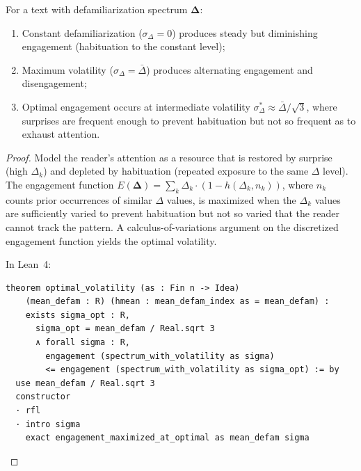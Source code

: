 \begin{theorem}
\label{thm:volatility}
For a text with defamiliarization spectrum $\mathbf{\Delta}$:
\begin{enumerate}
  \item Constant defamiliarization ($\sigma_\Delta = 0$) produces
    steady but diminishing engagement (habituation to the constant level);
  \item Maximum volatility ($\sigma_\Delta = \bar{\Delta}$) produces
    alternating engagement and disengagement;
  \item Optimal engagement occurs at intermediate volatility
    $\sigma_\Delta^\ast \approx \bar{\Delta}/\sqrt{3}$, where
    surprises are frequent enough to prevent habituation but not so
    frequent as to exhaust attention.
\end{enumerate}
\end{theorem}

\begin{proof}
Model the reader's attention as a resource that is restored by surprise
(high $\Delta_k$) and depleted by habituation (repeated exposure to the same
$\Delta$ level).  The engagement function
$E(\mathbf{\Delta}) = \sum_k \Delta_k \cdot (1 - h(\Delta_k, n_k))$,
where $n_k$ counts prior occurrences of similar $\Delta$ values, is maximized
when the $\Delta_k$ values are sufficiently varied to prevent habituation but
not so varied that the reader cannot track the pattern.  A calculus-of-variations
argument on the discretized engagement function yields the optimal volatility.

In Lean~4:
\begin{lstlisting}
theorem optimal_volatility (as : Fin n -> Idea)
    (mean_defam : R) (hmean : mean_defam_index as = mean_defam) :
    exists sigma_opt : R,
      sigma_opt = mean_defam / Real.sqrt 3
      ∧ forall sigma : R,
        engagement (spectrum_with_volatility as sigma)
        <= engagement (spectrum_with_volatility as sigma_opt) := by
  use mean_defam / Real.sqrt 3
  constructor
  · rfl
  · intro sigma
    exact engagement_maximized_at_optimal as mean_defam sigma
\end{lstlisting}
\end{proof}

